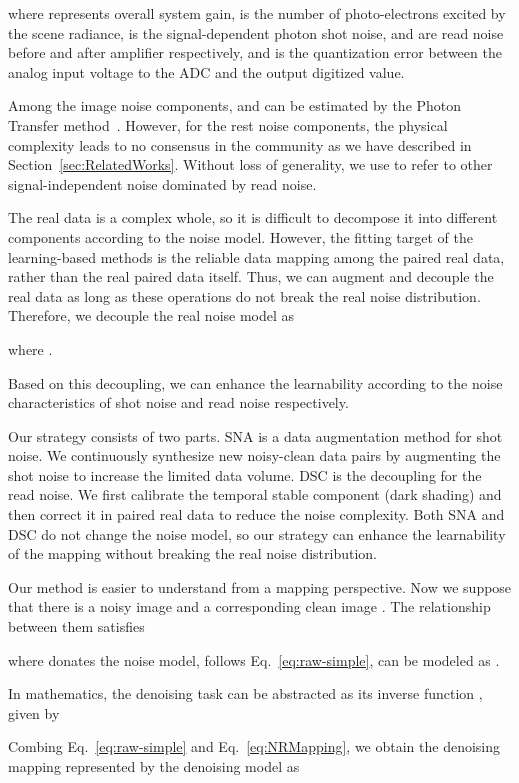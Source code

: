 \documentclass[sigconf,screen,nonacm]{acmart}
\begin{document}
where  represents overall system gain,  is the number of photo-electrons excited by the scene radiance,  is the signal-dependent photon shot noise,  and  are read noise before and after amplifier respectively, and  is the quantization error between the analog input voltage to the ADC and the output digitized value.

Among the image noise components,  and  can be estimated by the Photon Transfer method~\cite{SPIE85/CCD, EMVA1288}. However, for the rest noise components, the physical complexity leads to no consensus in the community as we have described in Section~\ref{sec:RelatedWorks}. Without loss of generality, we use  to refer to other signal-independent noise dominated by read noise. 

The real data is a complex whole, so it is difficult to decompose it into different components according to the noise model. However, the fitting target of the learning-based methods is the reliable data mapping among the paired real data, rather than the real paired data itself. Thus, we can augment and decouple the real data as long as these operations do not break the real noise distribution.
Therefore, we decouple the real noise model as

where .

Based on this decoupling, we can enhance the learnability according to the noise characteristics of shot noise and read noise respectively.

Our strategy consists of two parts.
SNA is a data augmentation method for shot noise. We continuously synthesize new noisy-clean data pairs by augmenting the shot noise to increase the limited data volume.
DSC is the decoupling for the read noise. We first calibrate the temporal stable component (dark shading) and then correct it in paired real data to reduce the noise complexity.
Both SNA and DSC do not change the noise model, so our strategy can enhance the learnability of the mapping without breaking the real noise distribution.

Our method is easier to understand from a mapping perspective.
Now we suppose that there is a noisy image  and a corresponding clean image . 
The relationship between them satisfies

where  donates the noise model,  follows Eq.~\eqref{eq:raw-simple},  can be modeled as .

In mathematics, the denoising task can be abstracted as its inverse function , given by


Combing Eq.~\eqref{eq:raw-simple} and Eq.~\eqref{eq:NRMapping}, we obtain the denoising mapping represented by the denoising model  as
\end{document}
